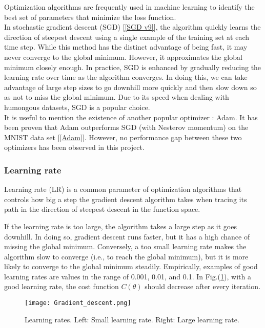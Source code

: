 \documentclass [12pt] {article}
\numberwithin{equation}{section} %
\numberwithin{figure}{section}   %
\begin{document}
Optimization algorithms are frequently used in machine learning to identify the best set of parameters that minimize the loss function.\\

In stochastic gradient descent (SGD) [\ref{SGD v9}], the algorithm quickly learns the direction of steepest descent using a single example of the training set at each time step. While this method has the distinct advantage of being fast, it may never converge to the global minimum. However, it approximates the global minimum closely enough. In practice, SGD is enhanced by gradually reducing the learning rate over time as the algorithm converges. In doing this, we can take advantage of large step sizes to go downhill more quickly and then slow down so as not to miss the global minimum. Due to its speed when dealing with humongous datasets, SGD is a popular choice.\\

It is useful to mention the existence of another popular optimizer : Adam. It has been proven that Adam outperforms SGD (with Nesterov momentum) on the MNIST data set [\ref{Adam}]. However, no performance gap between these two optimizers has been observed in this project.

\subsubsection*{Learning rate}

Learning rate (LR) is a common parameter of optimization algorithms that controls how big a step the gradient descent algorithm takes when tracing its path in the direction of steepest descent in the function space.

If the learning rate is too large, the algorithm takes a large step as it goes downhill. In doing so, gradient descent runs faster, but it has a high chance of missing the global minimum. Conversely, a too small learning rate makes the algorithm slow to converge (i.e., to reach the global minimum), but it is more likely to converge to the global minimum steadily. Empirically, examples of good learning rates are values in the range of 0.001, 0.01, and 0.1. In Fig.(\ref{LR}), with a good learning rate, the cost function $C(\theta)$ should decrease after every iteration.\\

\begin{figure}[H]
    \centering
    \texttt{[image: Gradient\_descent.png]}
    \caption{Learning rates. Left: Small learning rate. Right: Large learning rate.}
    \label{LR}
\end{figure}
\end{document}
